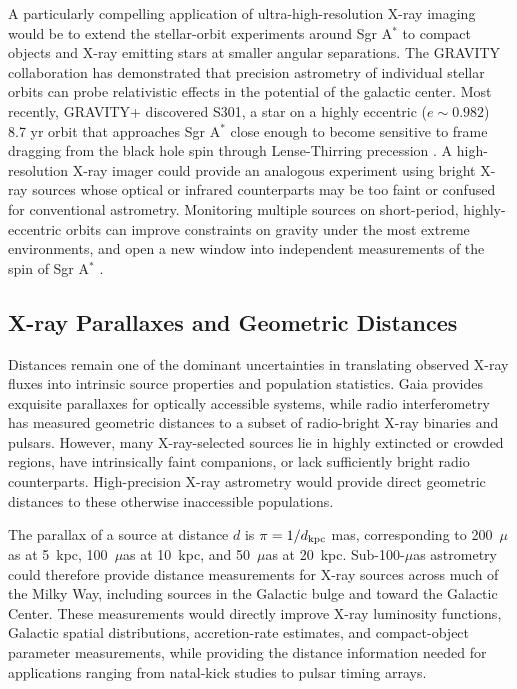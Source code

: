 \documentclass{article}
\begin{document}
A particularly compelling application of ultra-high-resolution X-ray imaging would be to extend the stellar-orbit experiments around Sgr A$^*$ to compact objects and X-ray emitting stars at smaller angular separations. The GRAVITY collaboration has demonstrated that precision astrometry of individual stellar orbits can probe relativistic effects in the potential of the galactic center. Most recently, GRAVITY+ discovered S301, a star on a highly eccentric ($e\sim0.982$) 8.7 yr orbit that approaches Sgr A$^*$ close enough to become sensitive to frame dragging from the black hole spin through Lense-Thirring precession \cite{2026arXiv260712664E}. A high-resolution X-ray imager could provide an analogous experiment using bright X-ray sources whose optical or infrared counterparts may be too faint or confused for conventional astrometry. Monitoring multiple sources on short-period, highly-eccentric orbits can improve constraints on gravity under the most extreme environments, and open a new window into independent measurements of the spin of Sgr A$^*$ \cite{2026arXiv260724931P}.


    
\subsection{X-ray Parallaxes and Geometric Distances} 
\label{sec:parallax_distance}

Distances remain one of the dominant uncertainties in translating observed X-ray fluxes into intrinsic source properties and population statistics. Gaia provides exquisite parallaxes for optically accessible systems, while radio interferometry has measured geometric distances to a subset of radio-bright X-ray binaries and pulsars. However, many X-ray-selected sources lie in highly extincted or crowded regions, have intrinsically faint companions, or lack sufficiently bright radio counterparts. High-precision X-ray astrometry would provide direct geometric distances to these otherwise inaccessible populations.

The parallax of a source at distance $d$ is $\pi = 1/d_{\rm kpc}$ mas, corresponding to 200~$\mu$as at 5~kpc, 100~$\mu$as at 10~kpc, and 50~$\mu$as at 20~kpc. Sub-100-$\mu$as astrometry could therefore provide distance measurements for X-ray sources across much of the Milky Way, including sources in the Galactic bulge and toward the Galactic Center. These measurements would directly improve X-ray luminosity functions, Galactic spatial distributions, accretion-rate estimates, and compact-object parameter measurements, while providing the distance information needed for applications ranging from natal-kick studies to pulsar timing arrays.
    
\end{document}
